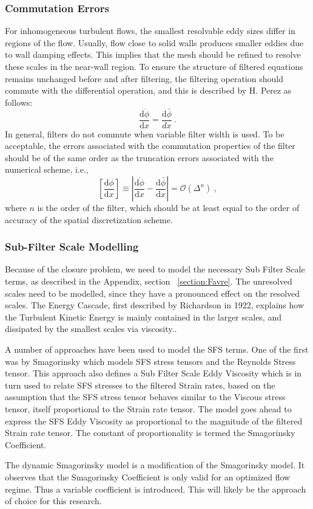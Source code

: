 \subsubsection{Commutation Errors} \label{section:commutation_errors}
For inhomogeneous turbulent flows, the smallest resolvable eddy sizes differ in regions of the flow. Usually, flow close to solid walls  produces smaller  eddies due to wall damping effects. This implies that the mesh should be refined to resolve these scales in the near-wall region. To ensure the structure of filtered equations remains unchanged before and after filtering, the filtering operation should commute with the differential operation, and this is described by H. Perez \cite{HPerez:2011} as follows: 
\begin{equation} 
\overline{\frac{\mathrm{d} \phi}{\mathrm{d} x} } = \frac{\mathrm{d} \bar{\phi}}{dx} \: .
\end{equation}
In general, filters do not commute when variable filter width is used. To be acceptable, the errors associated with the commutation properties of the filter should be of the same order as the truncation errors associated with the numerical scheme, i.e.,
 \begin{equation} \label{eq:commutation_error}
\left[ \frac{\mathrm{d} \phi}{\mathrm{d} x}   \right]  \equiv \left| \overline{\frac{\mathrm{d} \phi}{\mathrm{d} x} } - \frac{\mathrm{d} \bar{\phi}}{\mathrm{d}x}\right| = \mathcal{O}(\Delta^n) \: ,
\end{equation}
 where $n$ is the order of the filter, which should be at least equal to the order of accuracy of the spatial discretization scheme.


\subsubsection{Sub-Filter Scale Modelling}
Because of the closure problem, we need to model the necessary Sub Filter Scale terms, as described in the Appendix, section ~\ref{section:Favre}.
The unresolved scales need to be modelled, since they have a pronounced effect on the resolved scales. The Energy Cascade, first described by Richardson in 1922, explains how the Turbulent Kinetic Energy is mainly contained in the larger scales, and dissipated by the smallest scales via viscosity.\cite{Pope:2005}.\par
A number of approaches have been used to model the SFS terms. One of the first was by Smagorinsky \cite{Smagorinsky:1963} which models SFS stress tensors and the Reynolds Stress tensor. This approach also defines a Sub Filter Scale Eddy Viscosity which is in turn used to relate SFS stresses to the filtered Strain rates, based on the assumption that the SFS stress tensor behaves similar to the Viscous stress tensor, itself proportional to the Strain rate tensor. The model goes ahead to express the SFS Eddy Viscosity as proportional to the magnitude of the filtered Strain rate tensor. The constant of proportionality is termed the Smagorinsky Coefficient.

The dynamic Smagorinsky model is a modification of the Smagorinsky model. It observes that the Smagorinsky Coefficient is only valid for an optimized flow regime. Thus a variable coefficient is introduced. This will likely be the approach of choice for this research.